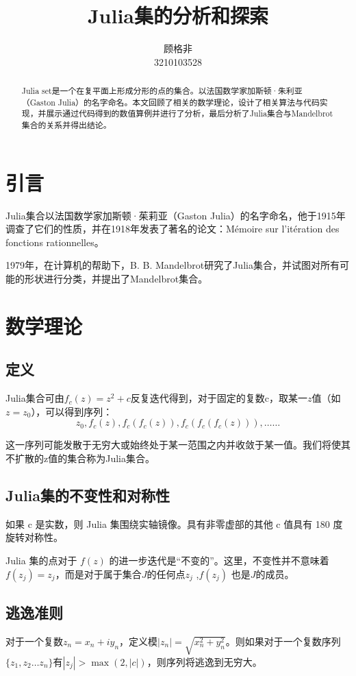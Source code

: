 \documentclass{ctexart}
\title{\vspace{-2.5cm}Julia集的分析和探索}
\author{顾格非\\3210103528}
\begin{document}
\maketitle
\begin{abstract}
    Julia set是一个在复平面上形成分形的点的集合\cite{a1}。以法国数学家加斯顿·朱利亚（Gaston Julia）的名字命名。本文回顾了相关的数学理论，设计了相关算法与代码实现，并展示通过代码得到的数值算例并进行了分析，最后分析了Julia集合与Mandelbrot集合的关系并得出结论。
\end{abstract}
\section{引言}

Julia集合以法国数学家加斯顿·茱莉亚（Gaston Julia）的名字命名，他于1915年调查了它们的性质，并在1918年发表了著名的论文：Mémoire sur l'itération des fonctions rationnelles。

1979年，在计算机的帮助下，B. B. Mandelbrot研究了Julia集合，并试图对所有可能的形状进行分类，并提出了Mandelbrot集合。
\vspace{-0.3cm}
\section{数学理论}
\vspace{-0.3cm}
\subsection{定义}
Julia集合可由$f_c(z)=z^2+c$反复迭代得到，对于固定的复数c，取某一$z$值（如$z=z_0$），可以得到序列：
$$
z_0,f_c(z),f_c(f_c(z)),f_c(f_c(f_c(z))),……
$$

这一序列可能发散于无穷大或始终处于某一范围之内并收敛于某一值。我们将使其不扩散的z值的集合称为Julia集合。

\subsection{Julia集的不变性和对称性}
如果 c 是实数，则 Julia 集围绕实轴镜像。具有非零虚部的其他 c 值具有 180 度旋转对称性\cite{a2}。

Julia 集的点对于 $f(z)$ 的进一步迭代是“不变的”。这里，不变性并不意味着 $f(z_j )=z_j$，而是对于属于集合$J$的任何点$z_j$ ,$f(z_j)$ 也是$J$的成员。

\subsection{逃逸准则}
对于一个复数$z_{n}=x_{n}+iy_{n}$，定义模$\left|z_{n}\right|=\sqrt{x_{n}^{2}+y_{n}^{2}}$。则如果对于一个复数序列$\{z_1, z_2 \ldots z_n\}$有$\left|z_{j}\right|>\max (2,|c|)$，则序列将逃逸到无穷大。
\end{document}
